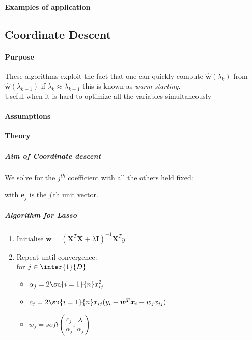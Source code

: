 \paragraph{Examples of application}

\subsection{Coordinate Descent}
\paragraph{Purpose}
These algorithms exploit the fact that one can quickly compute $\hat{\bm{w}}(
\lambda_{k})$ from $\hat{\bm{w}}(\lambda_{k-1})$ if $\lambda_{k} \approx \lambda_{k-1}$
this is known as \emph{warm starting}.\\
Useful when it is hard to optimize all the variables simultaneously 
\paragraph{Assumptions}
\paragraph{Theory}
\subparagraph{Aim of Coordinate descent}
We solve for the $j^{th}$ coefficient with all the others held fixed: 
\begin{center}
     with $\bm{e}_{j}$
    is the \emph{j}'th unit vector. 
\end{center}


\subparagraph{Algorithm for Lasso}
\begin{enumerate}
    \item Initialise $\bm{w} = \left(\bm{X}^{T}\bm{X} + \lambda\bm{I}\right)^{-1}\bm{X}^{T}y$
    \item Repeat until convergence:\\for $j\in\inter{1}{D}$
        \begin{itemize}
            \item $\alpha_{j} = 2\su{i=1}{n}x_{ij}^{2}$
            \item $c_{j} = 2\su{i=1}{n}x_{ij}(y_{i} - \bm{w}^{T}\bm{x}_{i} + w_{j}x_{ij})$
            \item $w_{j} = soft\left(\dfrac{c_{j}}{\alpha_{j}}, \dfrac{\lambda}{\alpha_{j}}\right)$
        \end{itemize}
\end{enumerate}


